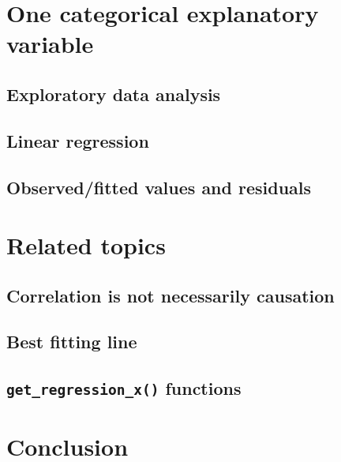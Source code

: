 \documentclass[
  12pt, krantz2,
]{krantz}
\begin{document}
\hypertarget{model2}{%
\section{One categorical explanatory variable}\label{model2}}

\hypertarget{model2EDA}{%
\subsection{Exploratory data analysis}\label{model2EDA}}

\hypertarget{model2table}{%
\subsection{Linear regression}\label{model2table}}

\hypertarget{model2points}{%
\subsection{Observed/fitted values and residuals}\label{model2points}}

\hypertarget{related-topics}{%
\section{Related topics}\label{related-topics}}

\hypertarget{correlation-is-not-causation}{%
\subsection{Correlation is not necessarily causation}\label{correlation-is-not-causation}}

\hypertarget{leastsquares}{%
\subsection{Best fitting line}\label{leastsquares}}

\hypertarget{underthehood}{%
\subsection{\texorpdfstring{\texttt{get\_regression\_x()} functions}{get\_regression\_x() functions}}\label{underthehood}}

\hypertarget{conclusion-4}{%
\section{Conclusion}\label{conclusion-4}}
\end{document}
